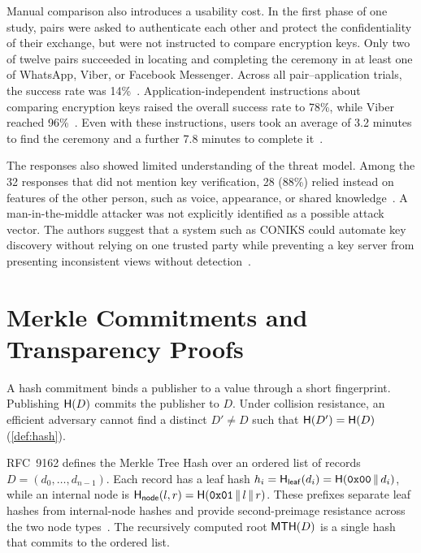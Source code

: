 Manual comparison also introduces a usability cost. In the first phase of one study, pairs were
asked to authenticate each other and protect the confidentiality of their exchange, but were
not instructed to compare encryption keys. Only two of twelve pairs succeeded in locating and
completing the ceremony in at least one of WhatsApp, Viber, or Facebook Messenger. Across all
pair--application trials, the success rate was
14\%~\cite[Sections~4.1 and~5]{vaziripour2017}.
Application-independent instructions about comparing encryption keys raised the overall success rate
to 78\%, while Viber reached 96\%~\cite[Section~6.1 and Table~2]{vaziripour2017}. Even with these instructions,
users took an average of 3.2 minutes to find the ceremony and a further 7.8 minutes to complete
it~\cite[Section~6.3]{vaziripour2017}.

The responses also showed limited understanding of the threat model. Among the 32 responses that did
not mention key verification, 28 (88\%) relied instead on features of the other person, such as
voice, appearance, or shared knowledge~\cite[Section~9]{vaziripour2017}. A man-in-the-middle attacker
was not explicitly identified as a possible attack vector. The authors suggest that a system such
as CONIKS could automate key discovery without relying on one trusted party while preventing a key
server from presenting inconsistent views without detection~\cite{vaziripour2017}.

\section{Merkle Commitments and Transparency Proofs}\label{sec:ext-merkle}

A hash commitment binds a publisher to a value through a short fingerprint. Publishing
$\mathsf{H}(D)$ commits the publisher to $D$. Under collision resistance, an efficient adversary cannot
find a distinct $D'\neq D$ such that $\mathsf{H}(D')=\mathsf{H}(D)$
(\cref{def:hash}).

RFC~9162 defines the Merkle Tree Hash over an ordered list of records
$D=(d_0,\ldots,d_{n-1})$. Each record has a leaf hash
$h_i=\mathsf{H}_{\mathsf{leaf}}(d_i)=\mathsf{H}(\texttt{0x00}\,\|\, d_i)$, while an internal node is
$\mathsf{H}_{\mathsf{node}}(l,r)=\mathsf{H}(\texttt{0x01}\,\|\, l\,\|\, r)$. These prefixes separate leaf hashes from
internal-node hashes and provide second-preimage resistance across the two node
types~\cite[Section~2.1.1]{rfc9162}. The recursively computed root
$\mathsf{MTH}(D)$ is a single hash that commits to the ordered list.

